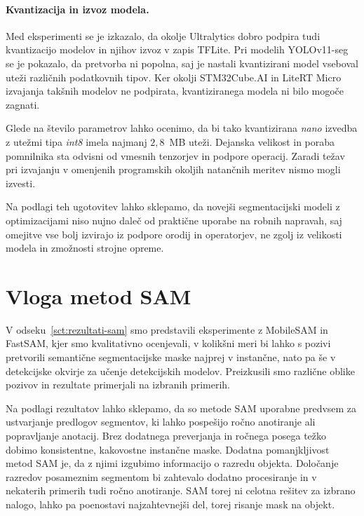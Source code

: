 \documentclass[a4paper,twoside,openright,12pt,slovene]{book}
\begin{document}
        \paragraph{Kvantizacija in izvoz modela.}
        Med eksperimenti se je izkazalo, da okolje Ultralytics dobro podpira
        tudi kvantizacijo modelov in njihov izvoz v zapis TFLite. Pri modelih
        YOLOv11-seg se je pokazalo, da pretvorba ni popolna, saj je
        nastali kvantizirani model vseboval uteži različnih podatkovnih tipov.
        Ker okolji STM32Cube.AI in LiteRT Micro izvajanja takšnih modelov ne
        podpirata, kvantiziranega modela ni bilo mogoče zagnati.

        Glede na število parametrov lahko ocenimo, da bi tako kvantizirana
        \emph{nano} izvedba z utežmi tipa \emph{int8} imela najmanj \(2{,}8\)\
        MB uteži. Dejanska velikost in poraba pomnilnika sta odvisni od vmesnih
        tenzorjev in podpore operacij. Zaradi težav pri izvajanju v omenjenih
        programskih okoljih natančnih meritev nismo mogli izvesti.

        Na podlagi teh ugotovitev lahko sklepamo, da novejši segmentacijski
        modeli z optimizacijami niso nujno daleč od praktične uporabe na robnih
        napravah, saj omejitve vse bolj izvirajo iz podpore orodij in
        operatorjev, ne zgolj iz velikosti modela in zmožnosti strojne opreme.

    \section{Vloga metod SAM}

        V odseku~\ref{sct:rezultati-sam} smo
        predstavili eksperimente z MobileSAM in FastSAM, kjer smo kvalitativno
        ocenjevali, v kolikšni meri bi lahko s pozivi pretvorili semantične
        segmentacijske maske najprej v instančne, nato pa še v detekcijske
        okvirje za učenje detekcijskih modelov. Preizkusili smo različne oblike
        pozivov
        in rezultate primerjali na izbranih primerih.

        Na podlagi rezultatov lahko sklepamo, da so metode SAM uporabne
        predvsem za ustvarjanje predlogov segmentov, ki lahko pospešijo ročno
        anotiranje ali popravljanje anotacij. Brez dodatnega preverjanja in
        ročnega posega težko dobimo konsistentne, kakovostne instančne maske.
        Dodatna pomanjkljivost metod SAM je, da z njimi izgubimo informacijo o
        razredu objekta. Določanje razredov posameznim segmentom bi
        zahtevalo dodatno procesiranje in v nekaterih primerih tudi ročno
        anotiranje. SAM torej ni celotna rešitev za izbrano
        nalogo, lahko pa poenostavi najzahtevnejši del, torej risanje mask na
        objekt.
\end{document}
